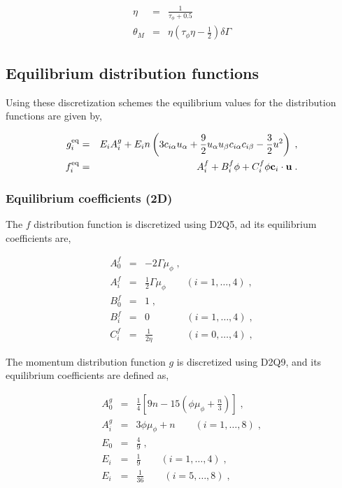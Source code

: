 \documentclass[12pt]{report}
\newcommand{\vect}[1]{\ensuremath{\mathrm{\mathbf{#1}}}}
\begin{document}
\begin{eqnarray}
\eta &=& \frac{1}{\tau_\phi + 0.5}\\
\theta_M &=& \eta\left(\tau_\phi\eta - \frac{1}{2}\right)\delta\Gamma
\end{eqnarray}

\subsection{Equilibrium distribution functions}
Using these discretization schemes the equilibrium values for the distribution functions are given by,

\begin{eqnarray}
    g_i^{\rm eq} &=& E_iA_i^g + E_i n\left( 3c_{i\alpha}u_{\alpha} + 
                         \frac{9}{2}u_{\alpha}u_{\beta}c_{i\alpha}c_{i\beta} - \frac{3}{2}u^{2}\right)\;,\\
    f_i^{\rm eq} &=& A_i^f+B_i^f\phi+C_i^f\phi\vect{c}_i\cdot\vect{u}\;.
\end{eqnarray}

\subsubsection*{Equilibrium coefficients (2D)}
The $f$ distribution function is discretized using D2Q5, ad its equilibrium coefficients are,

\begin{eqnarray}
A_0^f &=& -2\Gamma\mu_\phi \;,\\
A_i^f &=& \frac{1}{2}\Gamma\mu_\phi \quad\quad (i = 1,\dots,4) \;,\\
B_0^f &=& 1 \;,\\
B_i^f &=& 0\phantom{1_3}\phantom{\frac{1}{22}} \quad\quad (i = 1,\dots,4) \;,\\
C_i^f &=& \frac{1}{2\eta}\phantom{12_3} \quad\quad (i = 0,\dots,4)\;,
\end{eqnarray}

The momentum distribution function $g$ is discretized using D2Q9, and its equilibrium coefficients are defined as,

\begin{eqnarray}
A_0^g &=& \frac{1}{4}\left[ 9n - 15\left( \phi\mu_\phi + \frac{n}{3} \right) \right] \;,\\ 
A_i^g &=& 3\phi\mu_\phi + n \quad\quad (i = 1,\dots,8)\;,\\
E_0 &=& \frac{4}{9}\;,\\
E_i &=& \frac{1}{9} \quad\quad (i = 1,\dots,4)\;,\\
E_i &=& \frac{1}{36} \quad\quad (i = 5,\dots,8)\;,
\end{eqnarray}
\end{document}
